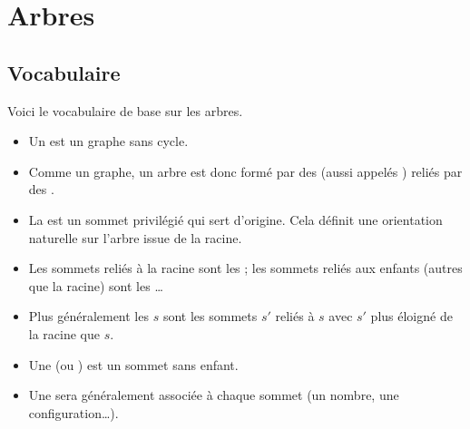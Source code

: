 \documentclass[11pt,class=report,crop=false]{standalone}
\begin{document}

%
%
%




\section{Arbres}


\subsection{Vocabulaire}

Voici le vocabulaire de base sur les arbres.
\begin{itemize}
	\item Un  est un graphe sans cycle.
	\item Comme un graphe, un arbre est donc formé par des  (aussi appelés ) reliés par des .
	\item La  est un sommet privilégié qui sert d'origine. Cela définit une orientation naturelle sur l'arbre issue de la racine.
	\item Les sommets reliés à la racine sont les  ; les sommets reliés aux enfants (autres que la racine) sont les \ldots
	\item Plus généralement les  $s$ sont les sommets  $s'$ reliés à $s$ avec $s'$ plus éloigné de la racine que $s$.
	\item Une  (ou ) est  un sommet sans enfant.
	\item Une  sera généralement associée à chaque sommet (un nombre, une configuration\ldots).
\end{itemize}


	
\end{document}
